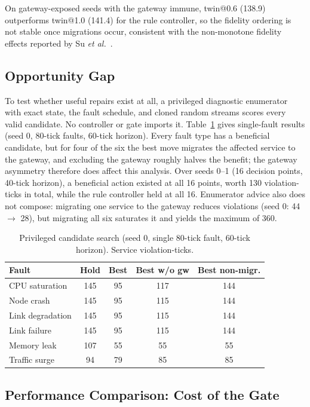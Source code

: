 \documentclass[conference]{IEEEtran}
\begin{document}
On gateway-exposed seeds with the gateway immune, twin@0.6 (138.9) outperforms twin@1.0 (141.4) for the rule controller, so the fidelity ordering is not stable once migrations occur, consistent with the non-monotone fidelity effects reported by Su \emph{et al.}~\cite{fidelityam}.

\subsection{Opportunity Gap}

To test whether useful repairs exist at all, a privileged diagnostic enumerator with exact state, the fault schedule, and cloned random streams scores every valid candidate. No controller or gate imports it. Table~\ref{tab:opp} gives single-fault results (seed 0, 80-tick faults, 60-tick horizon). Every fault type has a beneficial candidate, but for four of the six the best move migrates the affected service to the gateway, and excluding the gateway roughly halves the benefit; the gateway asymmetry therefore does affect this analysis. Over seeds 0--1 (16 decision points, 40-tick horizon), a beneficial action existed at all 16 points, worth 130 violation-ticks in total, while the rule controller held at all 16. Enumerator advice also does not compose: migrating one service to the gateway reduces violations (seed 0: 44 $\to$ 28), but migrating all six saturates it and yields the maximum of 360.

\begin{table}[t]
\centering
\caption{Privileged candidate search (seed 0, single 80-tick fault, 60-tick horizon). Service violation-ticks.}
\label{tab:opp}
\footnotesize
\begin{tabular}{@{}lcccc@{}}
\toprule
Fault & Hold & Best & Best w/o gw & Best non-migr. \\
\midrule
CPU saturation   & 145 & 95 & 117 & 144 \\
Node crash       & 145 & 95 & 115 & 144 \\
Link degradation & 145 & 95 & 115 & 144 \\
Link failure     & 145 & 95 & 115 & 144 \\
Memory leak      & 107 & 55 & 55  & 55  \\
Traffic surge    & 94  & 79 & 85  & 85  \\
\bottomrule
\end{tabular}
\end{table}

\subsection{Performance Comparison: Cost of the Gate}
\end{document}
